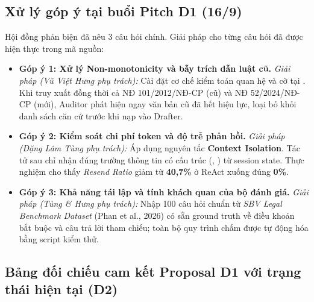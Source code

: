 \documentclass[10pt,a4paper]{article}
\begin{document}
\subsection{Xử lý góp ý tại buổi Pitch D1 (16/9)}
Hội đồng phản biện đã nêu 3 câu hỏi chính. Giải pháp cho từng câu hỏi đã được hiện thực trong mã nguồn:
\begin{itemize}
  \item \textbf{Góp ý 1: Xử lý Non-monotonicity và bẫy trích dẫn luật cũ.}
    \emph{Giải pháp (Vũ Việt Hưng phụ trách):} Cài đặt cơ chế kiểm toán quan hệ  và cờ  tại . Khi truy xuất đồng thời cả NĐ 101/2012/NĐ-CP (cũ) và NĐ 52/2024/NĐ-CP (mới), Auditor phát hiện ngay văn bản cũ đã hết hiệu lực, loại bỏ khỏi danh sách căn cứ trước khi nạp vào Drafter.
  \item \textbf{Góp ý 2: Kiểm soát chi phí token và độ trễ phản hồi.}
    \emph{Giải pháp (Đặng Lâm Tùng phụ trách):} Áp dụng nguyên tắc \textbf{Context Isolation}. Tác tử sau chỉ nhận đúng trường thông tin có cấu trúc (, ) từ session state. Thực nghiệm cho thấy \emph{Resend Ratio} giảm từ \textbf{40,7\%} ở ReAct xuống đúng \textbf{0\%}.
  \item \textbf{Góp ý 3: Khả năng tái lập và tính khách quan của bộ đánh giá.}
    \emph{Giải pháp (Tùng \& Hưng phụ trách):} Nhập 100 câu hỏi chuẩn từ \emph{SBV Legal Benchmark Dataset} (Phan et al., 2026) có sẵn ground truth về điều khoản bắt buộc và câu trả lời tham chiếu; toàn bộ quy trình chấm được tự động hóa bằng script kiểm thử.
\end{itemize}

\subsection{Bảng đối chiếu cam kết Proposal D1 với trạng thái hiện tại (D2)}
\end{document}
